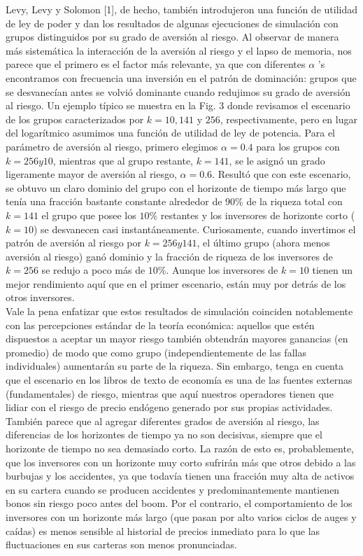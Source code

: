 \documentclass[12pt,a4paper]{article}
\begin{document}
\quad Levy, Levy y Solomon [1], de hecho, también introdujeron una función de utilidad de ley de poder y dan los resultados de algunas ejecuciones de simulación con grupos distinguidos por su grado de aversión al riesgo. Al observar de manera más sistemática la interacción de la aversión al riesgo y el lapso de memoria, nos parece que el primero es el factor más relevante, ya que con diferentes $ \alpha $ 's encontramos con frecuencia una inversión en el patrón de dominación: grupos que se desvanecían antes se volvió dominante cuando redujimos su grado de aversión al riesgo. Un ejemplo típico se muestra en la Fig. 3 donde revisamos el escenario de los grupos caracterizados por $ k = 10, 141 $ y $256$, respectivamente, pero en lugar del logarítmico asumimos una función de utilidad de ley de potencia. Para el parámetro de aversión al riesgo, primero elegimos $ \alpha = 0.4 $ para los grupos con $ k = 256 y 10 $, mientras que al grupo restante, $ k = 141 $, se le asignó un grado ligeramente mayor de aversión al riesgo, $ \alpha = 0.6 $. Resultó que con este escenario, se obtuvo un claro dominio del grupo con el horizonte de tiempo más largo que tenía una fracción bastante constante alrededor de $ 90\% $ de la riqueza total con $ k = 141 $
el grupo que posee los $ 10\%$ restantes y los inversores de horizonte corto ($ k = 10 $) se desvanecen casi instantáneamente. Curiosamente, cuando invertimos el patrón de aversión al riesgo por $ k = 256 y 141 $, el último grupo (ahora menos aversión al riesgo) ganó dominio y la fracción de riqueza de los inversores de $ k = 256 $ se redujo a poco más de $ 10\%$. Aunque los inversores de $ k = 10 $ tienen un mejor rendimiento aquí que en el primer escenario, están muy por detrás de los otros inversores.\\
\quad Vale la pena enfatizar que estos resultados de simulación coinciden notablemente con las percepciones estándar de la teoría económica: aquellos que estén dispuestos a aceptar un mayor riesgo también obtendrán mayores ganancias (en promedio) de modo que como grupo (independientemente de las fallas individuales) aumentarán su parte de la riqueza. Sin embargo, tenga en cuenta que el escenario en los libros de texto de economía es una de las fuentes externas (fundamentales) de riesgo, mientras que aquí nuestros operadores tienen que lidiar con el riesgo de precio endógeno generado por sus propias actividades. También parece que al agregar diferentes grados de aversión al riesgo, las diferencias de los horizontes de tiempo ya no son decisivas, siempre que el horizonte de tiempo no sea demasiado corto. La razón de esto es, probablemente, que los inversores con un horizonte muy corto sufrirán más que otros debido a las burbujas y los accidentes, ya que todavía tienen una fracción muy alta de activos en su cartera cuando se producen accidentes y predominantemente mantienen bonos sin riesgo poco antes del boom. Por el contrario, el comportamiento de los inversores con un horizonte más largo (que pasan por alto varios ciclos de auges y caídas) es menos sensible al historial de precios inmediato para lo que las fluctuaciones en sus carteras son menos pronunciadas.\\
\end{document}
